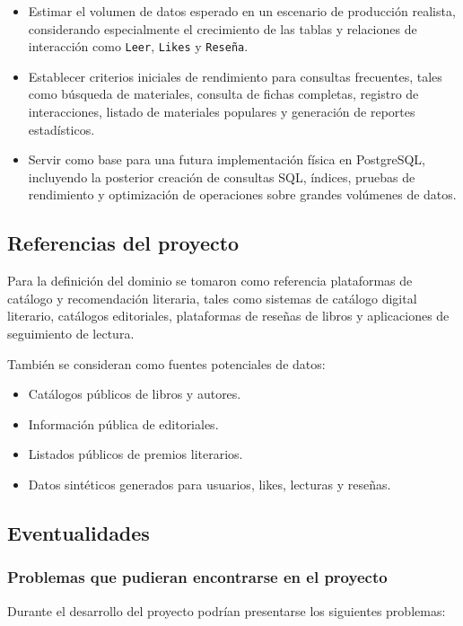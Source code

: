 \documentclass[12pt,a4paper]{article}
\begin{document}
\begin{itemize}
    \item Estimar el volumen de datos esperado en un escenario de producción realista, considerando especialmente el crecimiento de las tablas y relaciones de interacción como \texttt{Leer}, \texttt{Likes} y \texttt{Reseña}.

    \item Establecer criterios iniciales de rendimiento para consultas frecuentes, tales como búsqueda de materiales, consulta de fichas completas, registro de interacciones, listado de materiales populares y generación de reportes estadísticos.

    \item Servir como base para una futura implementación física en PostgreSQL, incluyendo la posterior creación de consultas SQL, índices, pruebas de rendimiento y optimización de operaciones sobre grandes volúmenes de datos.
\end{itemize}

\subsection{Referencias del proyecto}

Para la definición del dominio se tomaron como referencia plataformas de catálogo y recomendación literaria, tales como sistemas de catálogo digital literario, catálogos editoriales, plataformas de reseñas de libros y aplicaciones de seguimiento de lectura.

También se consideran como fuentes potenciales de datos:

\begin{itemize}
    \item Catálogos públicos de libros y autores.
    \item Información pública de editoriales.
    \item Listados públicos de premios literarios.
    \item Datos sintéticos generados para usuarios, likes, lecturas y reseñas.
\end{itemize}

\subsection{Eventualidades}

\subsubsection{Problemas que pudieran encontrarse en el proyecto}
Durante el desarrollo del proyecto podrían presentarse los siguientes problemas:
\end{document}

